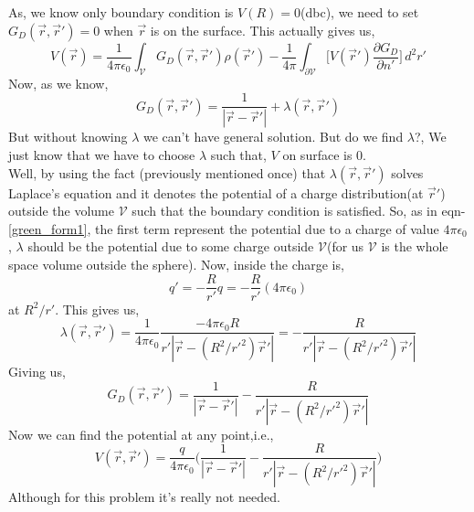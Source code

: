 \documentclass{article}
\begin{document}
As, we know only boundary condition is $V(R)=0$(\gls{dbc}), we need to set $G_D(\vec{r},\vec{r}')=0$ when $\vec{r}$ is on the surface. This actually gives us,
\begin{equation}
    V(\vec{r}) = \frac{1}{4\pi \epsilon_0}\int_{\mathcal{V}}G_D(\vec{r},\vec{r}')\rho(\vec{r}')-\frac{1}{4\pi}\int_{\partial \mathcal{V}}\Bigg[V(\vec{r}')\frac{\partial G_D}{\partial n'} \Bigg] \, d^2 r'
    \label{pot_green1}
\end{equation}
Now, as we know, 
\begin{equation}
    G_D(\vec{r},\vec{r}') = \frac{1}{|\vec{r}-\vec{r}'|} + \lambda(\vec{r},\vec{r}')
    \label{green_form1}
\end{equation}
But without knowing $\lambda$ we can't have general solution. But do we find $\lambda$?, We just know that we have to choose $\lambda$ such that, $V$ on surface is $0$.\\
Well, by using the fact (previously mentioned once) that $\lambda(\vec{r},\vec{r}')$ solves Laplace's equation and it denotes the potential of a charge distribution(at $\vec{r}'$) outside the volume $\mathcal{V}$ such that the boundary condition is satisfied. So, as in eqn-\ref{green_form1}, the first term represent the potential due to a charge of value $4\pi \epsilon_0$, $\lambda$ should be the potential due to some charge outside $\mathcal{V}$(for us $\mathcal{V}$ is the whole space volume outside the sphere). Now, inside the charge is,
\begin{equation*}
    q' = -\frac{R}{r'}q = -\frac{R}{r'}(4\pi \epsilon_0)
\end{equation*}
at $R^2/r'$. This gives us,
\begin{equation}
    \lambda(\vec{r},\vec{r}') = \frac{1}{4\pi \epsilon_0} \frac{-4\pi \epsilon_0 R}{r'|\vec{r} - (R^2/r'^2)\vec{r}'|}= -\frac{R}{r'|\vec{r} - (R^2/r'^2)\vec{r}'|}
\end{equation}
Giving us,
\begin{equation}
    G_D(\vec{r},\vec{r}') = \frac{1}{|\vec{r}-\vec{r}'|} -\frac{R}{r'|\vec{r} - (R^2/r'^2)\vec{r}'|}
\end{equation}
Now we can find the potential at any point,i.e.,
\begin{equation}
    V(\vec{r},\vec{r}') = \frac{q}{4\pi \epsilon_0}\Bigg( \frac{1}{|\vec{r}-\vec{r}'|} - \frac{R}{r'|\vec{r} - (R^2/r'^2)\vec{r}'|}\Bigg)
\end{equation}
Although for this problem it's really not needed.
\end{document}
